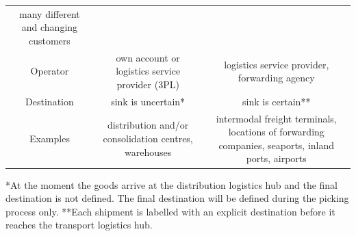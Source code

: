 \documentclass[
]{book}
\begin{document}
\begin{longtable}[]{@{}ccc@{}}
\begin{minipage}[t]{0.30\columnwidth}
many different and changing customers\strut
\end{minipage}\tabularnewline
\begin{minipage}[t]{0.30\columnwidth}\centering
Operator\strut
\end{minipage} & \begin{minipage}[t]{0.30\columnwidth}\centering
own account or logistics service provider (3PL)\strut
\end{minipage} & \begin{minipage}[t]{0.30\columnwidth}\centering
logistics service provider, forwarding agency\strut
\end{minipage}\tabularnewline
\begin{minipage}[t]{0.30\columnwidth}\centering
Destination\strut
\end{minipage} & \begin{minipage}[t]{0.30\columnwidth}\centering
sink is uncertain*\strut
\end{minipage} & \begin{minipage}[t]{0.30\columnwidth}\centering
sink is certain**\strut
\end{minipage}\tabularnewline
\begin{minipage}[t]{0.30\columnwidth}\centering
Examples\strut
\end{minipage} & \begin{minipage}[t]{0.30\columnwidth}\centering
distribution and/or consolidation centres, warehouses\strut
\end{minipage} & \begin{minipage}[t]{0.30\columnwidth}\centering
intermodal freight terminals, locations of forwarding companies, seaports, inland ports, airports\strut
\end{minipage}\tabularnewline
\bottomrule
\end{longtable}

*At the moment the goods arrive at the distribution logistics hub and the final destination is not defined. The final destination will be defined during the picking process only.
**Each shipment is labelled with an explicit destination before it reaches the transport logistics hub.
\end{document}

